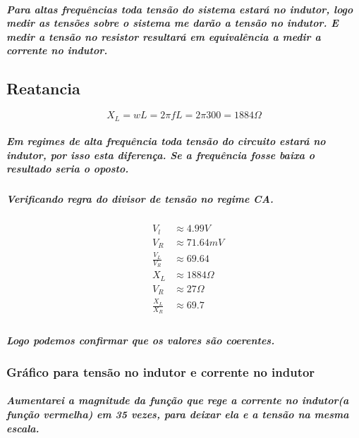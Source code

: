 \documentclass[12pt,twoside, a4paper, twocolumn]{article}
\begin{document}
\subparagraph*{Para altas frequências toda tensão do sistema estará no indutor, logo medir as tensões sobre o sistema me darão a tensão no indutor. E medir a tensão no resistor resultará em equivalência a medir a corrente no indutor.}

\subsection*{Reatancia}

\begin{equation}
  X_L = wL = 2 \pi f L = 2 \pi 300 = 1884 \varOmega
\end{equation}

\subparagraph*{Em regimes de alta frequência toda tensão do circuito estará no indutor, por isso esta diferença. Se a frequência fosse baixa o resultado seria o oposto.}
\subparagraph*{}

\subparagraph*{Verificando regra do divisor de tensão no regime CA.}

\begin{equation}
  \begin{aligned}
     & V_l             & \approx 4.99 V         \\
     & V_R             & \approx 71.64mV        \\
     & \frac{V_L}{V_R} & \approx 69.64          \\
     & X_L             & \approx 1884 \varOmega \\
     & V_R             & \approx 27 \varOmega   \\
     & \frac{X_L}{X_R} & \approx 69.7           \\
  \end{aligned}
\end{equation}

\subparagraph*{Logo podemos confirmar que os valores são coerentes.}

\subsubsection{Gráfico para tensão no indutor e corrente no indutor}
\subparagraph*{Aumentarei a magnitude da função que rege a corrente no indutor(a função vermelha) em 35 vezes, para deixar ela e a tensão na mesma escala. }

\subparagraph*{}
\end{document}
